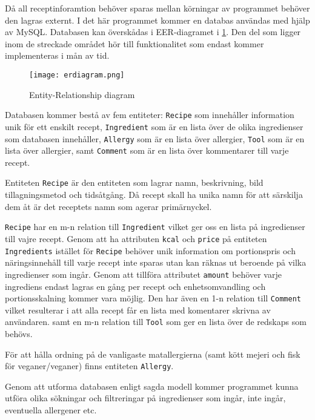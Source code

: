 Då all receptinforamtion behöver sparas mellan körningar av programmet
behöver den lagras externt. I det här programmet kommer en databas
användas med hjälp av MySQL. Databasen kan överskådas i EER-diagramet
i \ref{fig:erdiagram}. Den del som ligger inom de streckade området
hör till funktionalitet som endast kommer implementeras i mån av tid.

\begin{figure}[H]
        \centering 
        \texttt{[image: erdiagram.png]} 
        \caption{Entity-Relationship diagram} 
        \label{fig:erdiagram}
\end{figure}

Databasen kommer bestå av fem entiteter: \verb+Recipe+ som innehåller
information unik för ett enskilt recept, \verb+Ingredient+ som är en
lista över de olika ingredienser som databasen
innehåller, \verb+Allergy+ som är en lista över allergier, \verb+Tool+
som är en lista över allergier, samt
\verb+Comment+ som är en lista över kommentarer till varje recept.

Entiteten \verb+Recipe+ är den entiteten som lagrar namn, beskrivning,
bild tillagningsmetod och tidsåtgång. Då recept skall ha unika namn för att särskilja
dem åt är det receptets namn som agerar primärnyckel.

\verb+Recipe+ har en m-n relation till \verb+Ingredient+ vilket ger oss en
lista på ingredienser till vajre recept. Genom att ha
attributen \verb+kcal+ och \verb+price+ på
entiteten \verb+Ingredients+ istället för \verb+Recipe+ behöver unik
information om portionspris och näringsinnehåll till varje recept inte
sparas utan kan räknas ut beroende på vilka ingredienser som
ingår. Genom att tillföra attributet \verb+amount+ behöver varje
ingrediens endast lagras en gång per recept och enhetsomvandling och
portionsskalning kommer vara möjlig. Den har även en 1-n relation
till \verb+Comment+ vilket resulterar i att alla recept får en lista
med komentarer skrivna av användaren. samt en m-n relation
till \verb+Tool+ som ger en lista över de redskaps som behövs.

För att hålla ordning på de vanligaste matallergierna (samt kött
mejeri och fisk för veganer/veganer) finns entiteten \verb+Allergy+.

Genom att utforma databasen enligt sagda modell kommer programmet
kunna utföra olika sökningar och filtreringar på ingredienser som
ingår, inte ingår, eventuella allergener etc.



